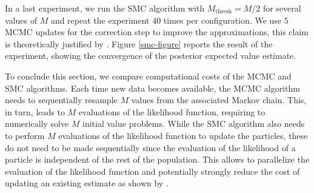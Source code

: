 In a last experiment, we run the SMC algorithm with $M_\text{thresh} = M/2$ for several values of $M$ and repeat the experiment $40$ times per configuration. We use $5$ MCMC updates for the correction step to improve the approximations, this claim is theoretically justified by \cite{marion2018finite}. Figure \ref{smc-figure} reports the result of the experiment, showing the convergence of the posterior expected value estimate.

To conclude this section, we compare computational costs of the MCMC and SMC algorithms. Each time new data becomes available, the MCMC algorithm needs to sequentially resample $M$ values from the associated Markov chain. This, in turn, leads to $M$ evaluations of the likelihood function, requiring to numerically solve $M$ initial value problems. While the SMC algorithm also needs to perform $M$ evaluations of the likelihood function to update the particles, these do not need to be made sequentially since the evaluation of the likelihood of a particle is independent of the rest of the population. This allows to parallelize the evaluation of the likelihood function and potentially strongly reduce the cost of updating an existing estimate as shown by \cite{lee2010utility}.

